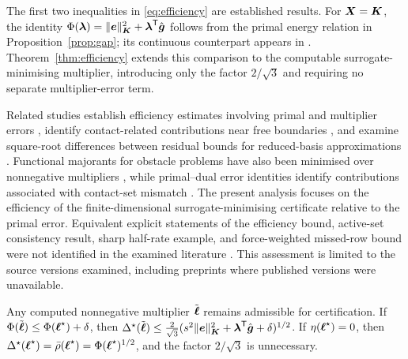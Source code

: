 The first two inequalities in \eqref{eq:efficiency} are established results. For $\boldsymbol{X}=\boldsymbol{K}$, the identity
$\Phi(\boldsymbol{\lambda})=\lVert \boldsymbol{e} \rVert_{\boldsymbol{K}}^2+\boldsymbol{\lambda}^{\mathsf{T}}\hat{\boldsymbol{g}}$ follows from the primal energy relation in Proposition~\ref{prop:gap}; its continuous counterpart
appears in \cite{bartels2025}. Theorem~\ref{thm:efficiency} extends this comparison to the computable surrogate-minimising multiplier,
introducing only the factor $2/\sqrt3$ and requiring no separate multiplier-error term.

Related studies establish efficiency estimates involving primal and multiplier errors \cite{veeser2001,braess2005,krause2015}, identify
contact-related contributions near free boundaries \cite{krause2015,weiss2010,braess2005}, and examine square-root differences between residual
bounds for reduced-basis approximations \cite{haasdonk2012}. Functional majorants for obstacle problems have also been minimised over
nonnegative multipliers \cite{repin2000,repin2007}, while primal--dual error identities identify contributions associated with contact-set mismatch
\cite{repin2018,bartels2025}. The present analysis focuses on the efficiency of the finite-dimensional surrogate-minimising certificate relative to
the primal error. Equivalent explicit statements of the efficiency bound, active-set consistency result, sharp half-rate example, and force-weighted
missed-row bound were not identified in the examined literature
\cite{haasdonk2012,zhang2016cr,zhang2016thesis,zhangs2020,bartels2025,ashby2024,veeser2001,braess2005,weiss2010,krause2015,nochetto2003,burkovska2015,benaceur2020,repin2000,repin2007,repin2018}.
This assessment is limited to the source versions examined, including preprints where published versions were unavailable.

\begin{remark}\label{rem:inexact}
Any computed nonnegative multiplier $\tilde{\boldsymbol{\ell}}$ remains admissible for certification. If
$\Phi(\tilde{\boldsymbol{\ell}})\le\Phi(\boldsymbol{\ell}^{\star})+\delta$, then
$\Delta^{\star}(\tilde{\boldsymbol{\ell}})\le\frac{2}{\sqrt3}(s^2\lVert \boldsymbol{e} \rVert_{\boldsymbol{K}}^2+\boldsymbol{\lambda}^{\mathsf{T}}\hat{\boldsymbol{g}}+\delta)^{1/2}$.
If $\eta(\boldsymbol{\ell}^{\star})=0$, then $\Delta^{\star}(\boldsymbol{\ell}^{\star})=\bar{\rho}(\boldsymbol{\ell}^{\star})=\Phi(\boldsymbol{\ell}^{\star})^{1/2}$, and the factor $2/\sqrt3$ is unnecessary.
\end{remark}

